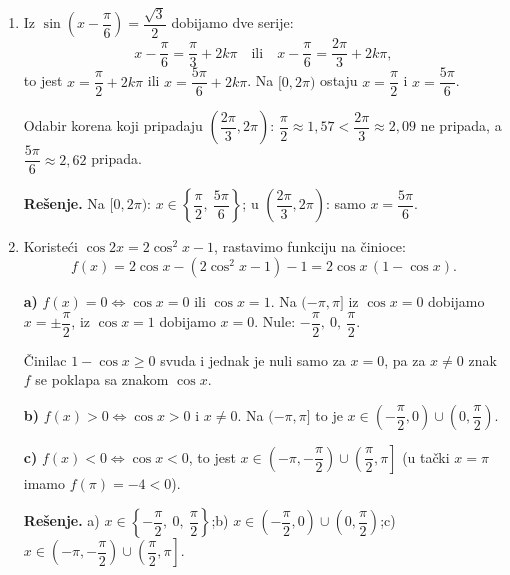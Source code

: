 \begin{enumerate}[label=\arabic*.]
\textbf{b)} Zamenom $\operatorname{ctg} x=\dfrac{1}{\operatorname{tg} x}$, dobijamo $\operatorname{tg}^2 x=3$, to jest $\operatorname{tg} x=\pm\sqrt3$. Iz $\operatorname{tg} x=\sqrt3$: $x=\dfrac{\pi}{3},\ \dfrac{4\pi}{3}$; iz $\operatorname{tg} x=-\sqrt3$: $x=\dfrac{2\pi}{3},\ \dfrac{5\pi}{3}$. Sve tačke u oblasti definisanosti.

\textbf{Rešenje.} a) $x\in\left\{\dfrac{\pi}{4},\ \dfrac{5\pi}{4}\right\}$;\quad b) $x\in\left\{\dfrac{\pi}{3},\ \dfrac{2\pi}{3},\ \dfrac{4\pi}{3},\ \dfrac{5\pi}{3}\right\}$.

\item Iz $\sin\!\left(x-\dfrac{\pi}{6}\right)=\dfrac{\sqrt3}{2}$ dobijamo dve serije:
\[x-\frac{\pi}{6}=\frac{\pi}{3}+2k\pi\quad\text{ili}\quad x-\frac{\pi}{6}=\frac{2\pi}{3}+2k\pi,\]
to jest $x=\dfrac{\pi}{2}+2k\pi$ ili $x=\dfrac{5\pi}{6}+2k\pi$. Na $[0,2\pi)$ ostaju $x=\dfrac{\pi}{2}$ i $x=\dfrac{5\pi}{6}$.

Odabir korena koji pripadaju $\left(\dfrac{2\pi}{3},2\pi\right)$: $\dfrac{\pi}{2}\approx1{,}57<\dfrac{2\pi}{3}\approx2{,}09$ ne pripada, a $\dfrac{5\pi}{6}\approx2{,}62$ pripada.

\textbf{Rešenje.} Na $[0,2\pi)$: $x\in\left\{\dfrac{\pi}{2},\ \dfrac{5\pi}{6}\right\}$; u $\left(\dfrac{2\pi}{3},2\pi\right)$: samo $x=\dfrac{5\pi}{6}$.

\item Koristeći $\cos 2x=2\cos^2 x-1$, rastavimo funkciju na činioce:
\[f(x)=2\cos x-(2\cos^2 x-1)-1=2\cos x\,(1-\cos x).\]

\textbf{a)} $f(x)=0\iff\cos x=0$ ili $\cos x=1$. Na $(-\pi,\pi]$ iz $\cos x=0$ dobijamo $x=\pm\dfrac{\pi}{2}$, iz $\cos x=1$ dobijamo $x=0$. Nule: $-\dfrac{\pi}{2},\ 0,\ \dfrac{\pi}{2}$.

Činilac $1-\cos x\ge 0$ svuda i jednak je nuli samo za $x=0$, pa za $x\ne 0$ znak $f$ se poklapa sa znakom $\cos x$.

\textbf{b)} $f(x)>0\iff\cos x>0$ i $x\ne 0$. Na $(-\pi,\pi]$ to je $x\in\left(-\dfrac{\pi}{2},0\right)\cup\left(0,\dfrac{\pi}{2}\right)$.

\textbf{c)} $f(x)<0\iff\cos x<0$, to jest $x\in\left(-\pi,-\dfrac{\pi}{2}\right)\cup\left(\dfrac{\pi}{2},\pi\right]$ (u tački $x=\pi$ imamo $f(\pi)=-4<0$).

\textbf{Rešenje.} a) $x\in\left\{-\dfrac{\pi}{2},\ 0,\ \dfrac{\pi}{2}\right\}$;\quad b) $x\in\left(-\dfrac{\pi}{2},0\right)\cup\left(0,\dfrac{\pi}{2}\right)$;\quad c) $x\in\left(-\pi,-\dfrac{\pi}{2}\right)\cup\left(\dfrac{\pi}{2},\pi\right]$.
\end{enumerate}
\clearpage
